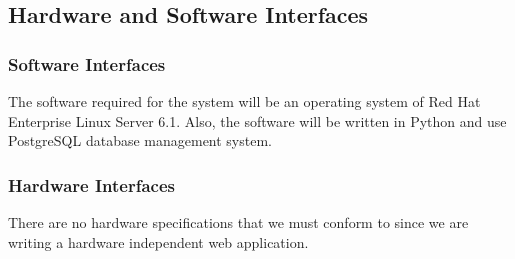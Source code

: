 \subsection{Hardware and Software Interfaces}
\subsubsection{Software Interfaces}
The software required for the system will be an operating system of Red Hat Enterprise Linux Server 6.1.  Also, the software will be written in Python and use \gls{PostgreSQL} database management system.

\subsubsection{Hardware Interfaces}
There are no hardware specifications that we must conform to since we are writing a hardware independent web application.